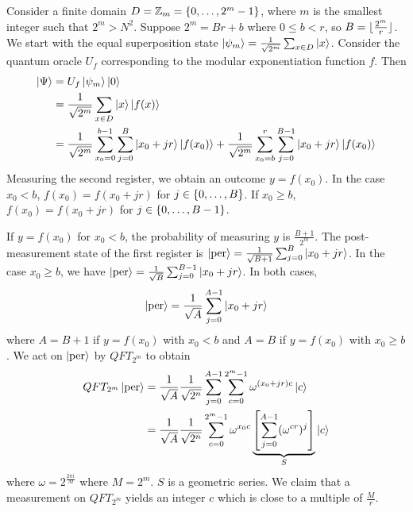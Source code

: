 Consider a finite domain \( D = \mathbb Z_m = \qty{0, \dots, 2^m - 1} \), where \( m \) is the smallest integer such that \( 2^m > N^2 \).
Suppose \( 2^m = Br + b \) where \( 0 \leq b < r \), so \( B = \lfloor\frac{2^m}{r}\rfloor \).
We start with the equal superposition state \( \ket{\psi_m} = \frac{1}{\sqrt{2^m}} \sum_{x \in D} \ket{x} \).
Consider the quantum oracle \( U_f \) corresponding to the modular exponentiation function \( f \).
Then
\begin{align*}
    \ket{\Psi} &= U_f \ket{\psi_m} \ket{0} \\
    &= \frac{1}{\sqrt{2^m}} \sum_{x \in D} \ket{x} \ket{f(x)} \\
    &= \frac{1}{\sqrt{2^m}} \sum_{x_0 = 0}^{b-1} \sum_{j=0}^B \ket{x_0 + jr} \ket{f(x_0)} + \frac{1}{\sqrt{2^m}} \sum_{x_0 = b}^r \sum_{j=0}^{B-1} \ket{x_0 + jr}\ket{f(x_0)}
\end{align*}
Measuring the second register, we obtain an outcome \( y = f(x_0) \).
In the case \( x_0 < b \), \( f(x_0) = f(x_0 + jr) \) for \( j \in \qty{0, \dots, B} \).
If \( x_0 \geq b \), \( f(x_0) = f(x_0 + jr) \) for \( j \in \qty{0, \dots, B - 1} \).

If \( y = f(x_0) \) for \( x_0 < b \), the probability of measuring \( y \) is \( \frac{B+1}{2^m} \).
The post-measurement state of the first register is \( \ket{\mathrm{per}} = \frac{1}{\sqrt{B+1}} \sum_{j=0}^B \ket{x_0 + jr} \).
In the case \( x_0 \geq b \), we have \( \ket{\mathrm{per}} = \frac{1}{\sqrt{B}} \sum_{j=0}^{B-1} \ket{x_0 + jr} \).
In both cases,
\[ \ket{\mathrm{per}} = \frac{1}{\sqrt{A}} \sum_{j=0}^{A-1} \ket{x_0 + jr} \]
where \( A = B+1 \) if \( y = f(x_0) \) with \( x_0 < b \) and \( A = B \) if \( y = f(x_0) \) with \( x_0 \geq b \).
We act on \( \ket{\mathrm{per}} \) by \( QFT_{2^m} \) to obtain
\begin{align*}
    QFT_{2^m} \ket{\mathrm{per}} &= \frac{1}{\sqrt{A}} \frac{1}{\sqrt{2^n}} \sum_{j = 0}^{A-1} \sum_{c=0}^{2^m - 1} \omega^{(x_0 + jr)c}\ket{c} \\
    &=  \frac{1}{\sqrt{A}} \frac{1}{\sqrt{2^n}} \sum_{c=0}^{2^m - 1} \omega^{x_0 c} \underbrace{\qty[\sum_{j = 0}^{A-1} (\omega^{cr})^j]}_{S} \ket{c} \\
\end{align*}
where \( \omega = 2^{\frac{2\pi i}{M}} \) where \( M = 2^m \).
\( S \) is a geometric series.
We claim that a measurement on \( QFT_{2^m} \) yields an integer \( c \) which is close to a multiple of \( \frac{M}{r} \).

